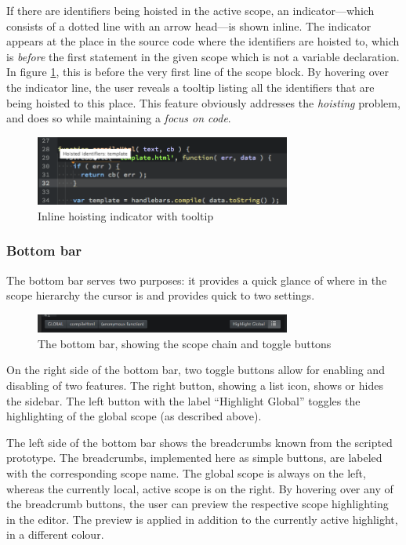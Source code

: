 If there are identifiers being hoisted in the active scope, an
indicator—which consists of a dotted line with an arrow head—is shown
inline. The indicator appears at the place in the source code where the
identifiers are hoisted to, which is \emph{before} the first statement
in the given scope which is not a variable declaration. In figure
\ref{fig:protohoisting}, this is before the very first line of the scope
block. By hovering over the indicator line, the user reveals a tooltip
listing all the identifiers that are being hoisted to this place. This
feature obviously addresses the \emph{hoisting} problem, and does so
while maintaining a \emph{focus on code}.

\begin{figure}[htbp]
\centering
\includegraphics[keepaspectratio,width=0.75\textwidth]{img/hoisting.png}
\caption{Inline hoisting indicator with tooltip}
\label{fig:protohoisting}
\end{figure}

\subsubsection{Bottom bar}\label{bottom-bar}

The bottom bar serves two purposes: it provides a quick glance of where
in the scope hierarchy the cursor is and provides quick to two settings.

\begin{figure}[htbp]
\centering
\includegraphics[keepaspectratio,width=0.75\textwidth]{img/bottombar.png}
\caption{The bottom bar, showing the scope chain and toggle buttons}
\label{fig:bottombar}
\end{figure}

On the right side of the bottom bar, two toggle buttons allow for
enabling and disabling of two features. The right button, showing a list
icon, shows or hides the sidebar. The left button with the label
“Highlight Global” toggles the highlighting of the global scope (as
described above).

The left side of the bottom bar shows the breadcrumbs known from the
scripted prototype. The breadcrumbs, implemented here as simple buttons,
are labeled with the corresponding scope name. The global scope is
always on the left, whereas the currently local, active scope is on the
right. By hovering over any of the breadcrumb buttons, the user can
preview the respective scope highlighting in the editor. The preview is
applied in addition to the currently active highlight, in a different
colour.

